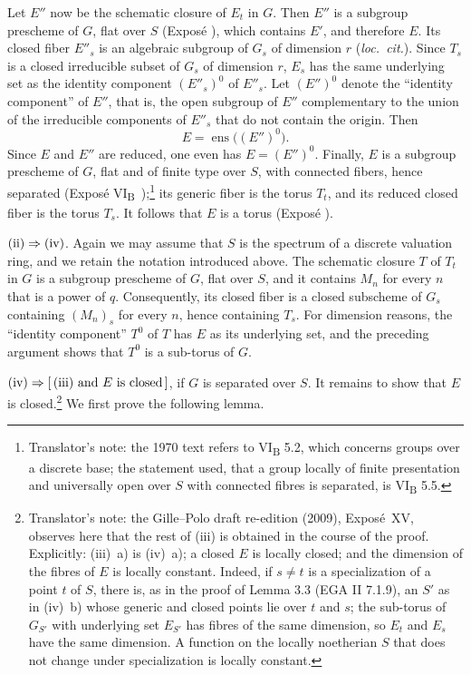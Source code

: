 Let \(E''\) now be the schematic closure of \(E_t\) in \(G\). Then
\(E''\) is a subgroup prescheme of \(G\), flat over \(S\)
(Exposé ), which contains \(E'\), and therefore \(E\). Its
closed fiber \(E''_s\) is an algebraic subgroup of \(G_s\) of
dimension \(r\) (\emph{loc.\ cit.}). Since \(T_s\) is a closed
irreducible subset of \(G_s\) of dimension \(r\), \(E_s\) has the
same underlying set as the identity component \((E''_s)^0\) of
\(E''_s\). Let \((E'')^0\) denote the ``identity component'' of
\(E''\), that is, the open subgroup of \(E''\) complementary to the
union of the irreducible components of \(E''_s\) that do not contain
the origin. Then
\[
  E=\operatorname{ens}\bigl((E'')^0\bigr).
\]
Since \(E\) and \(E''\) are reduced, one even has
\(E=(E'')^0\). Finally, \(E\) is a subgroup prescheme of \(G\), flat
and of finite type over \(S\), with connected fibers, hence separated
(Exposé VI\textsubscript{B}~);\footnote{Translator's
note: the 1970 text refers to VI\textsubscript{B} 5.2, which concerns
groups over a discrete base; the statement used, that a group locally
of finite presentation and universally open over \(S\) with connected
fibres is separated, is VI\textsubscript{B} 5.5.} its generic fiber is the torus
\(T_t\), and its reduced closed fiber is the torus \(T_s\). It follows
that \(E\) is a torus (Exposé ).

\medskip
\noindent\(\textup{(ii)}\Rightarrow\textup{(iv)}\).
Again we may assume that \(S\) is the spectrum of a discrete valuation
ring, and we retain the notation introduced above. The schematic
closure \(T\) of \(T_t\) in \(G\) is a subgroup prescheme of \(G\),
flat over \(S\), and it contains \(M_n\) for every \(n\) that is a
power of \(q\). Consequently, its closed fiber is a closed subscheme
of \(G_s\) containing \((M_n)_s\) for every \(n\), hence containing
\(T_s\). For dimension reasons, the ``identity component'' \(T^0\)
of \(T\) has \(E\) as its underlying set, and the preceding argument
shows that \(T^0\) is a sub-torus of \(G\).

\medskip
\noindent\(\textup{(iv)}\Rightarrow
[\,\textup{(iii)}\text{ and }E\text{ is closed}\,]\), if \(G\) is
separated over \(S\). It remains to show that \(E\) is
closed.\footnote{Translator's note: the Gille--Polo draft re-edition
(2009), Exposé~XV, observes here that the rest of (iii) is obtained in
the course of the proof. Explicitly: (iii)~a) is (iv)~a); a closed \(E\)
is locally closed; and the dimension of the fibres of \(E\) is locally
constant. Indeed, if \(s\neq t\) is a specialization of a point \(t\)
of \(S\), there is, as in the proof of Lemma 3.3 (EGA II 7.1.9), an
\(S'\) as in (iv)~b) whose generic and closed points lie over \(t\) and
\(s\); the sub-torus of
\(G_{S'}\) with underlying set \(E_{S'}\) has fibres of the same
dimension, so \(E_t\) and \(E_s\) have the same dimension. A function
on the locally noetherian \(S\) that does not change under
specialization is locally constant.} We first prove the following lemma.

